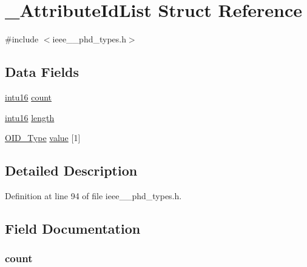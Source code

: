 \hypertarget{struct___attribute_id_list}{}\section{\+\_\+\+Attribute\+Id\+List Struct Reference}
\label{struct___attribute_id_list}


{\ttfamily \#include $<$ieee\+\_\+\_\+phd\+\_\+types.\+h$>$}

\subsection*{Data Fields}
\begin{DoxyCompactItemize}
\item 
\hyperlink{ieee__11073__phd__types_8h_a3561595d2aa7416532e1c9910abd076d}{intu16} \hyperlink{struct___attribute_id_list_abf6db060ae8e224764b0f867fb135ecd}{count}
\item 
\hyperlink{ieee__11073__phd__types_8h_a3561595d2aa7416532e1c9910abd076d}{intu16} \hyperlink{struct___attribute_id_list_a3743679e4ff85e3e1b3fc2e59973fbb3}{length}
\item 
\hyperlink{ieee__11073__phd__types_8h_aa4d7af235d4a95d6632aa0d64160dd62}{O\+I\+D\+\_\+\+Type} \hyperlink{struct___attribute_id_list_a33f73b3d426a499e63aae9644dd8813a}{value} \mbox{[}1\mbox{]}
\end{DoxyCompactItemize}


\subsection{Detailed Description}


Definition at line 94 of file ieee\+\_\+\_\+phd\+\_\+types.\+h.



\subsection{Field Documentation}
\hypertarget{struct___attribute_id_list_abf6db060ae8e224764b0f867fb135ecd}{}
\subsubsection[{count}]{ count}\label{struct___attribute_id_list_abf6db060ae8e224764b0f867fb135ecd}


